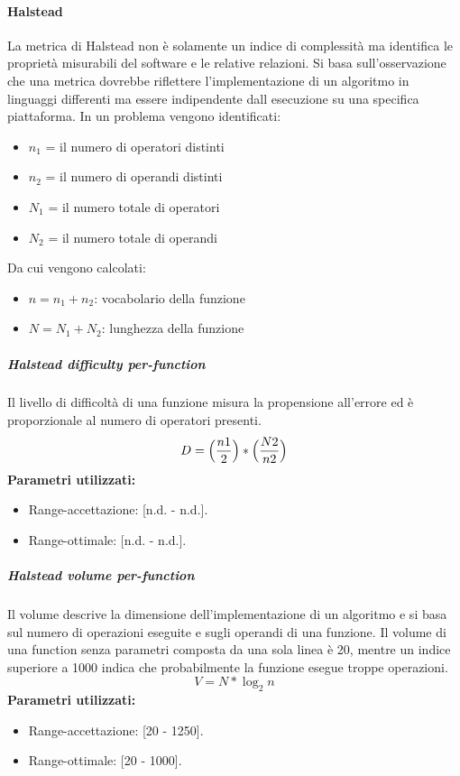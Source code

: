 			\paragraph{Halstead}
			La metrica di Halstead non è solamente un indice di complessità ma identifica le proprietà misurabili del software e le relative relazioni.
			Si basa sull'osservazione che una metrica dovrebbe riflettere l'implementazione di un algoritmo in linguaggi differenti ma essere indipendente dall esecuzione su una specifica piattaforma.
			In un problema vengono identificati:
			\begin{itemize}
				\item $n_1$ = il numero di operatori distinti
				\item $n_2$ = il numero di operandi distinti
				\item $N_1$ = il numero totale di operatori
				\item $N_2$ = il numero totale di operandi
			\end{itemize}
			Da cui vengono calcolati:
				\begin{itemize}
				\item $n = n_1 + n_2$: vocabolario della funzione
				\item $N = N_1 + N_2$: lunghezza della funzione
			\end{itemize}
			
			\subparagraph{Halstead difficulty per-function}
			Il livello di difficoltà di una funzione misura la propensione all'errore ed è proporzionale al numero di operatori presenti. 
			\[
			 D = \Bigl( \dfrac{n1}{2} \Bigr)  * \Bigl(  \dfrac{N2}{n2} \Bigr)
			 \]
			 \textbf{Parametri utilizzati:}
			\begin{itemize}
				\item Range-accettazione: [n.d. - n.d.].
				\item Range-ottimale: [n.d. - n.d.].
			\end{itemize}
			
			\subparagraph{Halstead volume per-function}
			Il volume descrive la dimensione dell'implementazione di un algoritmo e si basa sul numero di operazioni eseguite e sugli operandi di una funzione. Il volume di una function senza parametri composta da una sola linea è 20, mentre un indice superiore a 1000 indica che probabilmente la funzione esegue troppe operazioni.
			\[
			 V = N * \log_{2}n
			\]
			\textbf{Parametri utilizzati:}
			\begin{itemize}
				\item Range-accettazione: [20 - 1250].
				\item Range-ottimale: [20 - 1000].
			\end{itemize}
			
